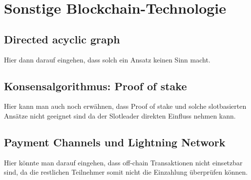 \chapter{Sonstige Blockchain-Technologie} %
\section{Directed acyclic graph}
Hier dann darauf eingehen, dass solch ein Ansatz keinen Sinn macht.
\section{Konsensalgorithmus: Proof of stake }\label{pos}
Hier kann man auch noch erwähnen, dass Proof of stake und solche slotbasierten Ansätze nicht geeignet sind da der Slotleader direkten Einfluss nehmen kann.
\section{Payment Channels und Lightning Network}
Hier könnte man darauf eingehen, dass off-chain Transaktionen nicht einsetzbar sind, da die restlichen Teilnehmer somit nicht die Einzahlung überprüfen können.